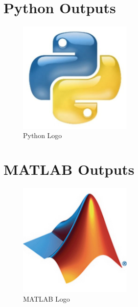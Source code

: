 \documentclass{article}
\begin{document}
\section{Python Outputs}
\begin{figure}[h]
    \centering
    \includegraphics[width=0.5\textwidth]{misc_media/Python-Logo.jpg}
    \caption{Python Logo}  %
    \label{fig:python-logo} %
\end{figure}

\vspace{2cm}  %


% 
% 
% 

\section{MATLAB Outputs}
\begin{figure}[h]
    \centering
    \includegraphics[width=0.5\textwidth]{misc_media/Matlab-Logo.jpg}
    \caption{MATLAB Logo}  %
    \label{fig:matlab-logo} %
\end{figure}
\end{document}
